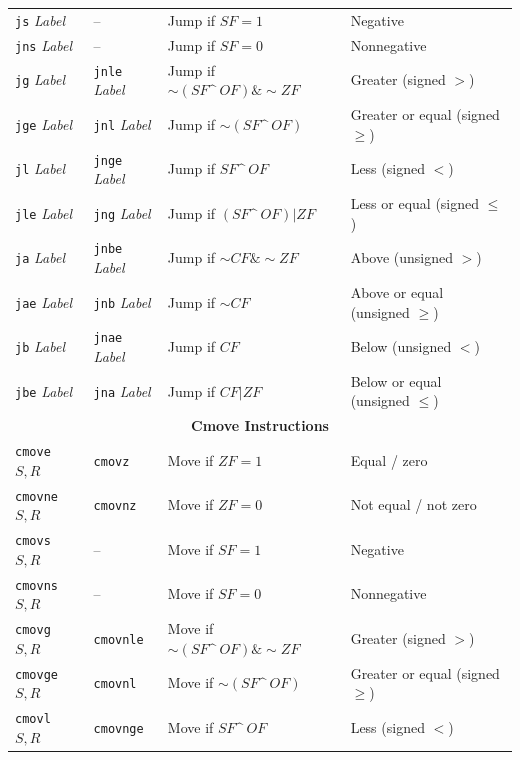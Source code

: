 \documentclass{article}
\begin{document}
\begin{table}[h]
\begin{tabular}{l l l l}
        \texttt{js} \textit{Label}  & – & Jump if $SF = 1$ & Negative \\
        \texttt{jns} \textit{Label}  & – & Jump if $SF = 0$ & Nonnegative \\
        \texttt{jg} \textit{Label}  & \texttt{jnle} \textit{Label} & Jump if $\sim (SF \^\ OF) \& \sim ZF$ & Greater (signed $>$) \\
        \texttt{jge} \textit{Label}  & \texttt{jnl} \textit{Label} & Jump if $\sim (SF \^\ OF)$ & Greater or equal (signed $\geq$) \\
        \texttt{jl} \textit{Label}  & \texttt{jnge} \textit{Label} & Jump if $SF \^\ OF$ & Less (signed $<$) \\
        \texttt{jle} \textit{Label}  & \texttt{jng} \textit{Label} & Jump if $(SF \^\ OF) | ZF$ & Less or equal (signed $\leq$) \\
        \texttt{ja} \textit{Label}  & \texttt{jnbe} \textit{Label} & Jump if $\sim CF \& \sim ZF$ & Above (unsigned $>$) \\
        \texttt{jae} \textit{Label}  & \texttt{jnb} \textit{Label} & Jump if $\sim CF$ & Above or equal (unsigned $\geq$) \\
        \texttt{jb} \textit{Label}  & \texttt{jnae} \textit{Label} & Jump if $CF$ & Below (unsigned $<$) \\
        \texttt{jbe} \textit{Label}  & \texttt{jna} \textit{Label} & Jump if $CF | ZF$ & Below or equal (unsigned $\leq$) \\
        \midrule
        \multicolumn{4}{c}{\textbf{Cmove Instructions}} \\
        \midrule
        \texttt{cmove} $S, R$  & \texttt{cmovz} & Move if $ZF = 1$ & Equal / zero \\
        \texttt{cmovne} $S, R$  & \texttt{cmovnz} & Move if $ZF = 0$ & Not equal / not zero \\
        \texttt{cmovs} $S, R$  & – & Move if $SF = 1$ & Negative \\
        \texttt{cmovns} $S, R$  & – & Move if $SF = 0$ & Nonnegative \\
        \texttt{cmovg} $S, R$  & \texttt{cmovnle} & Move if $\sim (SF \^\ OF) \& \sim ZF$ & Greater (signed $>$) \\
        \texttt{cmovge} $S, R$  & \texttt{cmovnl} & Move if $\sim (SF \^\ OF)$ & Greater or equal (signed $\geq$) \\
        \texttt{cmovl} $S, R$  & \texttt{cmovnge} & Move if $SF \^\ OF$ & Less (signed $<$) \\

\end{tabular}
\end{table}
\end{document}

